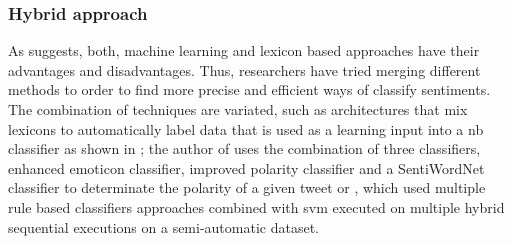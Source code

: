 \subsubsection{Hybrid approach}
\label{subsubsec:techniques_hybrid}

As \cite{thakkar2015approaches} suggests, both, machine learning and lexicon based approaches have their advantages and disadvantages. Thus, researchers have tried merging different methods to order to find more precise and efficient ways of classify sentiments. The combination of techniques are variated, such as architectures that mix lexicons to automatically label data that is used as a learning input into a \acrfull{nb} classifier as shown in \cite{pak2010twitter}; the author of \cite{khan2014tom} uses the combination of three classifiers, enhanced emoticon classifier, improved polarity classifier and a SentiWordNet classifier to determinate the polarity of a given tweet or \cite{prabowo2009sentiment}, which used multiple rule based classifiers approaches combined with \acrshort{svm} executed on multiple hybrid sequential executions on a semi-automatic dataset.